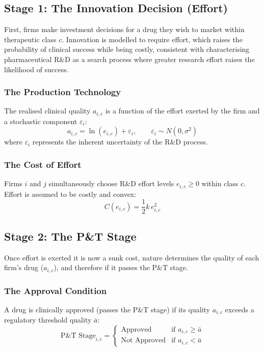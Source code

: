 \documentclass[12pt]{article}
\begin{document}
\newpage

\subsection{Stage 1: The Innovation Decision (Effort)}

First, firms make investment decisions for a drug they wish to market within therapeutic class $c$. Innovation is modelled to require effort, which raises the probability of clinical success while being costly, consistent with \citeauthor{sutton1998technology} characterising pharmaceutical R\&D as a search process where greater research effort raises the likelihood of success.

\subsubsection{The Production Technology}
The realised clinical quality $a_{i,c}$ is a function of the effort exerted by the firm and a stochastic component $\varepsilon_i$:
\begin{equation}
    a_{i,c} = \ln(e_{i,c}) + \varepsilon_i, \qquad \varepsilon_i \sim N(0, \sigma^2)
\end{equation}
where $\varepsilon_i$ represents the inherent uncertainty of the R\&D process.

\subsubsection{The Cost of Effort}
Firms $i$ and $j$ simultaneously choose R\&D effort levels $e_{i,c} \geq 0$ within class $c$. Effort is assumed to be costly and convex:
\begin{equation}
    C(e_{i,c}) = \frac{1}{2} k \, e_{i,c}^2
\end{equation}

\subsection{Stage 2: The P\&T Stage}
Once effort is exerted it is now a sunk cost, nature determines the quality of each firm's drug ($a_{i,c}$), and therefore if it passes the P\&T stage.

\subsubsection{The Approval Condition}
A drug is clinically approved (passes the P\&T stage) if its quality $a_{i,c}$ exceeds a regulatory threshold quality $\bar{a}$:
\begin{equation}
    \text{P\&T Stage}_{i,c} = 
    \begin{cases} 
        \text{Approved} & \text{if } a_{i,c} \geq \bar{a} \\
        \text{Not Approved} & \text{if } a_{i,c} < \bar{a}
    \end{cases}
\end{equation}
\end{document}
